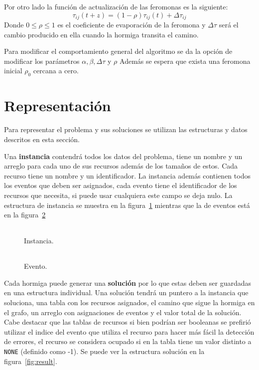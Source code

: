 \documentclass[letter, 10pt]{article}
\renewcommand{\tt}[1]{\texttt{#1}}
\renewcommand{\bf}[1]{\textbf{#1}}
\begin{document}
Por otro lado la función de actualización de las feromonas es la siguiente:
\begin{equation} \label{eq:pher}
  \tau_{ij}(t+z) = (1-\rho)\tau_{ij}(t) + \Delta \tau_{ij}
\end{equation}
Donde $0 \leq \rho \leq 1$ es el coeficiente de evaporación de la feromona y
$\Delta\tau$ será el cambio producido en ella cuando la hormiga transita el
camino.

Para modificar el comportamiento general del algoritmo se da la opción de
modificar los parámetros $\alpha, \beta, \Delta\tau$ y $\rho$ Además se espera
que exista una feromona inicial $\rho_0$ cercana a cero.

\section{Representación}\label{sec:repr}
Para representar el problema y sus soluciones se utilizan las estructuras y
datos descritos en esta sección.

Una \bf{instancia} contendrá todos los datos del problema, tiene un nombre y un
arreglo para cada uno de sus recursos además de los tamaños de estos. Cada
recurso tiene un nombre y un identificador. La instancia además contienen todos
los eventos que deben ser asignados, cada evento tiene el identificador de los
recursos que necesita, si puede usar cualquiera este campo se deja nulo.
La estructura de instancia se muestra en la figura~\ref{fig:inst} mientras que
la de eventos está en la figura~\ref{fig:event}

\begin{figure}[htpb]
  \centering
  \begin{tabular}{c}
    
  \end{tabular}
  \caption{Instancia.}
  \label{fig:inst}
\end{figure}

\begin{figure}[htpb]
  \centering
  \begin{tabular}{c}
    
  \end{tabular}
  \caption{Evento.}
  \label{fig:event}
\end{figure}

Cada hormiga puede generar una \bf{solución} por lo que estas deben ser
guardadas en una estructura individual. Una solución tendrá un puntero a la
instancia que soluciona, una tabla con los recursos asignados, el camino que
sigue la hormiga en el grafo, un arreglo con asignaciones de eventos y el valor
total de la solución. Cabe destacar que las tablas de recursos si bien podrían
ser booleanas se prefirió utilizar el indice del evento que utiliza el recurso
para hacer más fácil la detección de errores, el recurso se considera ocupado
si en la tabla tiene un valor distinto a \tt{NONE} (definido como -1).
Se puede ver la estructura solución en la figura~\ref{fig:result}.
\end{document}
